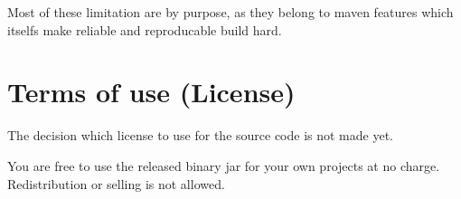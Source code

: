 \documentclass[a4paper,11pt,english,oneside,halfparskip]{scrartcl}
\begin{document}
Most of these limitation are by purpose, as they belong to maven features which itselfs make reliable and reproducable build hard.

\section{Terms of use (License)}

The decision which license to use for the source code is not made yet. 

You are free to use the released binary jar for your own projects at no charge. Redistribution or selling is not allowed.
\end{document}
